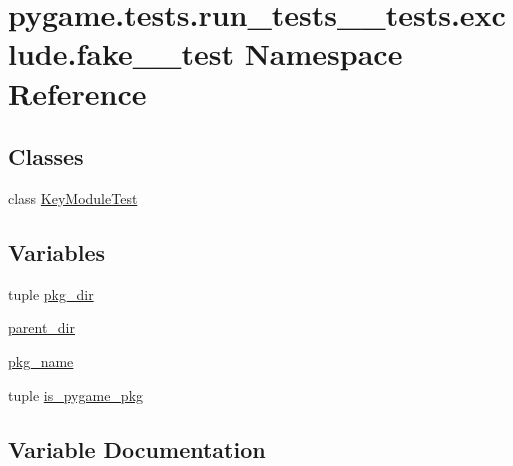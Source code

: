 \hypertarget{namespacepygame_1_1tests_1_1run__tests____tests_1_1exclude_1_1fake__2__test}{}\section{pygame.\+tests.\+run\+\_\+tests\+\_\+\+\_\+tests.\+exclude.\+fake\+\_\+\_\+test Namespace Reference}
\label{namespacepygame_1_1tests_1_1run__tests____tests_1_1exclude_1_1fake__2__test}
\subsection*{Classes}
\begin{DoxyCompactItemize}
\item 
class \hyperlink{classpygame_1_1tests_1_1run__tests____tests_1_1exclude_1_1fake__2__test_1_1_key_module_test}{Key\+Module\+Test}
\end{DoxyCompactItemize}
\subsection*{Variables}
\begin{DoxyCompactItemize}
\item 
tuple \hyperlink{namespacepygame_1_1tests_1_1run__tests____tests_1_1exclude_1_1fake__2__test_aec34c51b9bc7a8e78e51930ccf7dcc5e}{pkg\+\_\+dir}
\item 
\hyperlink{namespacepygame_1_1tests_1_1run__tests____tests_1_1exclude_1_1fake__2__test_ac934cb3c8dc604e9bbb70815cfecda55}{parent\+\_\+dir}
\item 
\hyperlink{namespacepygame_1_1tests_1_1run__tests____tests_1_1exclude_1_1fake__2__test_aa5172ba2e3d2d5fd3a2c8f09c2bde3d3}{pkg\+\_\+name}
\item 
tuple \hyperlink{namespacepygame_1_1tests_1_1run__tests____tests_1_1exclude_1_1fake__2__test_a44326d2edf7433958dee2ab04cea87ac}{is\+\_\+pygame\+\_\+pkg}
\end{DoxyCompactItemize}


\subsection{Variable Documentation}
\mbox{\label{namespacepygame_1_1tests_1_1run__tests____tests_1_1exclude_1_1fake__2__test_a44326d2edf7433958dee2ab04cea87ac}} 

